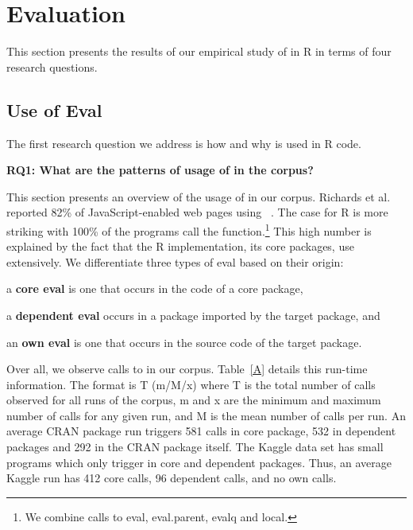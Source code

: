 \documentclass[USenglish,cleveref, autoref, thm-restate]{lipics-v2019}
\begin{document}
\section{Evaluation}

This section presents the results of our empirical study of \eval in R in terms
of four research questions.

\subsection{Use of Eval}

The first research question we address is how and why \eval is used in R code.

\begin{center}{\bfseries RQ1: What are the patterns of usage of \eval in the corpus?}\end{center}

This section presents an overview of the usage of \eval in our corpus. Richards
et al. reported 82\% of JavaScript-enabled web pages using \eval~\cite{ecoop11}.
The case for R is more striking with 100\% of the programs call the \eval
function.\footnote{We combine calls to {\sf eval}, {\sf eval.parent}, {\sf
    evalq} and {\sf local}.} This high number is explained by the fact that the
R implementation, its core packages, use \eval extensively. We differentiate
three types of eval based on their origin:
%
\begin{compactitem}[$-$]
  \item a {\bf core eval} is one that occurs in the code of a core package,
  \item a {\bf dependent eval} occurs in a package imported by the target
  package, and
  \item an {\bf own eval} is one that occurs in the source code of the target
  package.
\end{compactitem}

Over all, we observe \AllAllCallCountRnd calls to \eval in our corpus.
Table~\ref{A} details this run-time information. The format is T (m/M/x)
where T is the total number of calls observed for all runs of the corpus, m
and x are the minimum and maximum number of calls for any given run, and M
is the mean number of calls per run. An average CRAN package run triggers
581 {\eval} calls in core package, 532 in dependent packages and 292 in the
CRAN package itself.  The Kaggle data set has small programs which only
trigger \eval in core and dependent packages. Thus, an average Kaggle run
has 412 core calls, 96 dependent calls, and no own calls.
\end{document}
